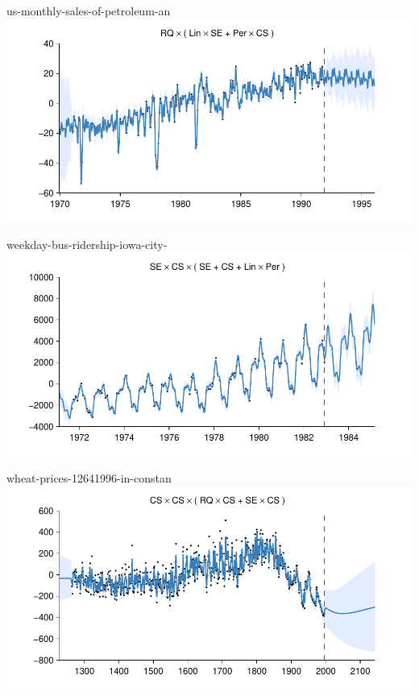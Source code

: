     
\begin{frame}{us-monthly-sales-of-petroleum-an}
  \center
  \includegraphics[width=1.0\textwidth]{figures/us-monthly-sales-of-petroleum-an/us-monthly-sales-of-petroleum-an_all}
\end{frame}  


    
\begin{frame}{weekday-bus-ridership-iowa-city-}
  \center
  \includegraphics[width=1.0\textwidth]{figures/weekday-bus-ridership-iowa-city-/weekday-bus-ridership-iowa-city-_all}
\end{frame}  


    
\begin{frame}{wheat-prices-12641996-in-constan}
  \center
  \includegraphics[width=1.0\textwidth]{figures/wheat-prices-12641996-in-constan/wheat-prices-12641996-in-constan_all}
\end{frame}  


